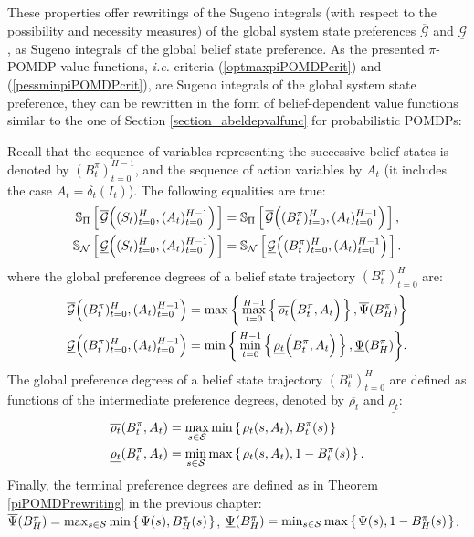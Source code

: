 These properties offer rewritings of the Sugeno integrals 
(with respect to the possibility and necessity measures) 
of the global system state preferences 
$\overline{\mathcal{G}}$ and $\underline{\mathcal{G}}$, 
as Sugeno integrals of the global belief state preference.
As the presented $\pi$-POMDP value functions, 
\textit{i.e.} criteria (\ref{optmaxpiPOMDPcrit})
and (\ref{pessminpiPOMDPcrit}), are Sugeno integrals 
of the global system state preference,
they can be rewritten in the form of belief-dependent
value functions similar to the one of Section \ref{section_abeldepvalfunc} 
for probabilistic POMDPs:\\
\begin{theorem}
Recall that the sequence of variables representing the successive belief states
is denoted by $(B^{\pi}_t)_{t=0}^{H-1}$, and the sequence of action variables
by $A_t$ (it includes the case $A_t = \delta_t(I_t)$). 
The following equalities are true:
\label{theorem_intermpref}
\begin{align}
\mathbb{S}_{\Pi} \left[ \left.   \overline{\mathcal{G}} \Big( (S_t)_{t=0}^{H}, (A_t)_{t=0}^{H-1} \Big)  \right. \right] &= \mathbb{S}_{\Pi} \left[ \left.  \overline{\mathcal{G}} \Big( (B^{\pi}_t)_{t=0}^{H},  (A_t)_{t=0}^{H-1} \Big)   \right. \right], \\
\mathbb{S}_{\mathcal{N}} \left[ \left.  \underline{\mathcal{G}} \Big( (S_t)_{t=0}^{H}, (A_t)_{t=0}^{H-1} \Big)   \right. \right] &= \mathbb{S}_{\mathcal{N}} \left[ \left. \underline{\mathcal{G}} \Big( (B^{\pi}_t)_{t=0}^{H},  (A_t)_{t=0}^{H-1} \Big)  \right. \right].
\end{align}
where the global preference degrees of a belief state trajectory $(B^{\pi}_t)_{t=0}^{H}$ are:
\begin{align*}
\overline{\mathcal{G}} \Big( (B^{\pi}_t)_{t=0}^{H}, (A_t)_{t=0}^{H-1} \Big) &= \max \bigg\{ \max_{t=0}^{H-1} \left\{ \left.  \overline{\rho_t}\Big( B_t^{\pi}, A_t \Big)   \right. \right\}, \overline{\Psi}(B_H^{\pi}) \bigg\}\\ 
\underline{\mathcal{G}} \Big( (B^{\pi}_t)_{t=0}^{H}, (A_t)_{t=0}^{H-1} \Big) &= \min \bigg\{ \min_{t=0}^{H-1} \left\{ \left.  \underline{\rho_t}\Big( B_t^{\pi}, A_t \Big)   \right. \right\}, \underline{\Psi}(B_H^{\pi}) \bigg\}.
\end{align*}
The global preference degrees of a belief state trajectory $(B^{\pi}_t)_{t=0}^H$ 
are defined as functions of the intermediate preference degrees, 
denoted by $\overline{\rho_t}$ and $\underline{\rho_t}$:
\begin{align*}
\overline{\rho_t}(B^{\pi}_t,A_t) & = \max_{s \in \mathcal{S}} \min \left\{ \left.  \rho_t(s,A_t) , B^{\pi}_t(s)  \right. \right\} \\ 
\underline{\rho_t}(B^{\pi}_t,A_t) & = \min_{s \in \mathcal{S}} \max \left\{ \left.  \rho_t(s,A_t), 1 - B^{\pi}_t(s)  \right. \right\}.
\end{align*}
Finally, the terminal preference degrees are defined as in Theorem \ref{piPOMDPrewriting}
in the previous chapter: $\overline{\Psi}(B^{\pi}_H)= \max_{s \in \mathcal{S}} \min \left\{ \left.  \Psi(s) , B^{\pi}_H(s)  \right. \right\}$,
$\underline{\Psi}(B^{\pi}_H) = \min_{s \in \mathcal{S}} \max \left\{ \left.  \Psi(s) , 1 - B^{\pi}_H(s)  \right. \right\}$.
\end{theorem}
